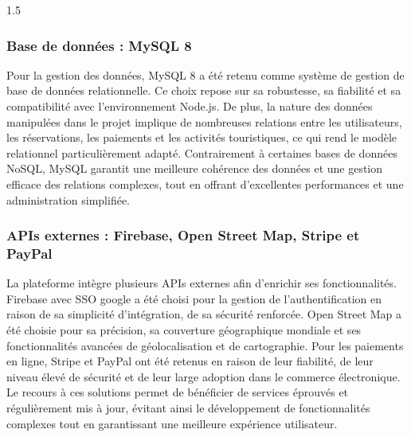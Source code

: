 \documentclass[a4paper,12pt]{report}
\begin{document}
\begin{spacing}{1.5}
\subsubsection{Base de données : MySQL 8}

Pour la gestion des données, MySQL 8 \cite{mysql} a été retenu comme système de gestion de base de données relationnelle. Ce choix repose sur sa robustesse, sa fiabilité et sa compatibilité avec l'environnement Node.js. De plus, la nature des données manipulées dans le projet implique de nombreuses relations entre les utilisateurs, les réservations, les paiements et les activités touristiques, ce qui rend le modèle relationnel particulièrement adapté. Contrairement à certaines bases de données NoSQL, MySQL garantit une meilleure cohérence des données et une gestion efficace des relations complexes, tout en offrant d'excellentes performances et une administration simplifiée.

\subsubsection{APIs externes : Firebase, Open Street Map, Stripe et PayPal}

La plateforme intègre plusieurs APIs externes afin d'enrichir ses fonctionnalités. 
Firebase \cite{firebase2024} avec SSO google a été choisi pour la gestion de l'authentification en raison de sa simplicité d'intégration, de sa sécurité renforcée.  
Open Street Map \cite{openstreetmap2024} a été choisie pour sa précision, sa couverture géographique mondiale et ses fonctionnalités avancées de géolocalisation et de cartographie. Pour les paiements en ligne, Stripe \cite{stripeapi} et PayPal \cite{paypal2024} ont été retenus en raison de leur fiabilité, de leur niveau élevé de sécurité et de leur large adoption dans le commerce électronique. Le recours à ces solutions permet de bénéficier de services éprouvés et régulièrement mis à jour, évitant ainsi le développement de fonctionnalités complexes tout en garantissant une meilleure expérience utilisateur.
\end{spacing}
\end{document}
